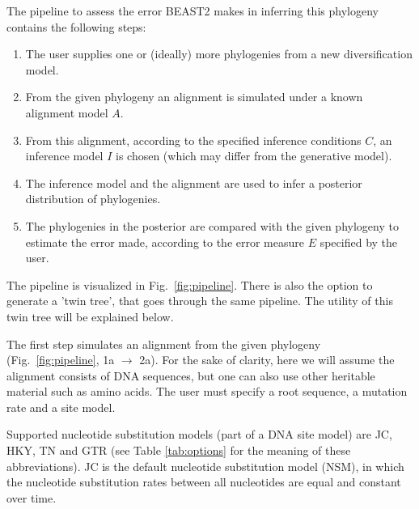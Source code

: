 The pipeline to assess the error BEAST2 makes in inferring this phylogeny 
contains the following steps:
\begin{enumerate}
  \item The user supplies one or (ideally) more phylogenies from a 
    new diversification model.
  \item From the given phylogeny an alignment is simulated 
    under a known alignment model $\mathit{A}$.
  \item From this alignment, according to the specified 
    inference conditions $\mathit{C}$, 
    an inference model $\mathit{I}$ is chosen (which may differ from the 
    generative model).
  \item The inference model and the alignment are used 
    to infer a posterior distribution of phylogenies.
  \item The phylogenies in the posterior are compared with the given phylogeny 
    to estimate the error made, according to 
    the error measure $\mathit{E}$ specified by the user.
\end{enumerate}

The pipeline is visualized in Fig.~\ref{fig:pipeline}. 
There is also the option to generate a 'twin tree', 
that goes through the same pipeline. 
The utility of this twin tree will be explained below.

The first step simulates an alignment from the given 
phylogeny (Fig.~\ref{fig:pipeline}, 1a $\rightarrow$ 2a).
For the sake of clarity, here we will assume the alignment consists
of DNA sequences, but one can also use other heritable material such as amino acids.
The user must specify a root sequence, a mutation rate and a site model.

{}
Supported nucleotide substitution models (part of a DNA
site model) are JC, HKY, TN and GTR (see Table \ref{tab:options} for
the meaning of these abbreviations).
JC is the default nucleotide substitution model (NSM),
in which the nucleotide substitution rates between all
nucleotides are equal and constant over time.


